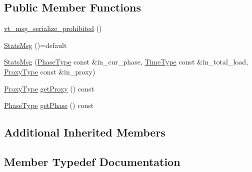 \subsection*{Public Member Functions}
\begin{DoxyCompactItemize}
\item 
\hyperlink{structvt_1_1vrt_1_1collection_1_1balance_1_1_stats_msg_a3b71dc47eec1881fb243bf50e20f9a44}{vt\+\_\+msg\+\_\+serialize\+\_\+prohibited} ()
\item 
\hyperlink{structvt_1_1vrt_1_1collection_1_1balance_1_1_stats_msg_af801cc4ea278bc1d03ef87760cdb0ce4}{Stats\+Msg} ()=default
\item 
\hyperlink{structvt_1_1vrt_1_1collection_1_1balance_1_1_stats_msg_a0bab7add3b1971d1f2f0826128ab5a30}{Stats\+Msg} (\hyperlink{namespacevt_a46ce6733d5cdbd735d561b7b4029f6d7}{Phase\+Type} const \&in\+\_\+cur\+\_\+phase, \hyperlink{namespacevt_a876a9d0cd5a952859c72de8a46881442}{Time\+Type} const \&in\+\_\+total\+\_\+load, \hyperlink{structvt_1_1vrt_1_1collection_1_1balance_1_1_stats_msg_a6f88a58947e0a02b3f7dcfec8b91b5fd}{Proxy\+Type} const \&in\+\_\+proxy)
\item 
\hyperlink{structvt_1_1vrt_1_1collection_1_1balance_1_1_stats_msg_a6f88a58947e0a02b3f7dcfec8b91b5fd}{Proxy\+Type} \hyperlink{structvt_1_1vrt_1_1collection_1_1balance_1_1_stats_msg_ad6c41dfbee2143acc207716115023933}{get\+Proxy} () const
\item 
\hyperlink{namespacevt_a46ce6733d5cdbd735d561b7b4029f6d7}{Phase\+Type} \hyperlink{structvt_1_1vrt_1_1collection_1_1balance_1_1_stats_msg_a81328064a6ff12f8ae9629bdb400836e}{get\+Phase} () const
\end{DoxyCompactItemize}
\subsection*{Additional Inherited Members}


\subsection{Member Typedef Documentation}
\mbox{\label{structvt_1_1vrt_1_1collection_1_1balance_1_1_stats_msg_aebee389cbc279025a82f4542c9413724}} 
